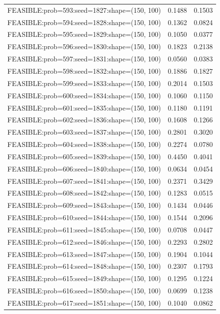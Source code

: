 \begin{longtable}{lcc}
FEASIBLE:prob=593:seed=1827:shape=(150, 100) &   0.1488 & 0.1503 \\
FEASIBLE:prob=594:seed=1828:shape=(150, 100) &   0.1362 & 0.0824 \\
FEASIBLE:prob=595:seed=1829:shape=(150, 100) &   0.1050 & 0.0377 \\
FEASIBLE:prob=596:seed=1830:shape=(150, 100) &   0.1823 & 0.2138 \\
FEASIBLE:prob=597:seed=1831:shape=(150, 100) &   0.0560 & 0.0383 \\
FEASIBLE:prob=598:seed=1832:shape=(150, 100) &   0.1886 & 0.1827 \\
FEASIBLE:prob=599:seed=1833:shape=(150, 100) &   0.2014 & 0.1503 \\
FEASIBLE:prob=600:seed=1834:shape=(150, 100) &   0.1060 & 0.1150 \\
FEASIBLE:prob=601:seed=1835:shape=(150, 100) &   0.1180 & 0.1191 \\
FEASIBLE:prob=602:seed=1836:shape=(150, 100) &   0.1608 & 0.1266 \\
FEASIBLE:prob=603:seed=1837:shape=(150, 100) &   0.2801 & 0.3020 \\
FEASIBLE:prob=604:seed=1838:shape=(150, 100) &   0.2274 & 0.0780 \\
FEASIBLE:prob=605:seed=1839:shape=(150, 100) &   0.4450 & 0.4041 \\
FEASIBLE:prob=606:seed=1840:shape=(150, 100) &   0.0634 & 0.0454 \\
FEASIBLE:prob=607:seed=1841:shape=(150, 100) &   0.2371 & 0.3429 \\
FEASIBLE:prob=608:seed=1842:shape=(150, 100) &   0.1283 & 0.0515 \\
FEASIBLE:prob=609:seed=1843:shape=(150, 100) &   0.1434 & 0.0446 \\
FEASIBLE:prob=610:seed=1844:shape=(150, 100) &   0.1544 & 0.2096 \\
FEASIBLE:prob=611:seed=1845:shape=(150, 100) &   0.0708 & 0.0447 \\
FEASIBLE:prob=612:seed=1846:shape=(150, 100) &   0.2293 & 0.2802 \\
FEASIBLE:prob=613:seed=1847:shape=(150, 100) &   0.1904 & 0.1044 \\
FEASIBLE:prob=614:seed=1848:shape=(150, 100) &   0.2307 & 0.1793 \\
FEASIBLE:prob=615:seed=1849:shape=(150, 100) &   0.1295 & 0.1224 \\
FEASIBLE:prob=616:seed=1850:shape=(150, 100) &   0.0699 & 0.1238 \\
FEASIBLE:prob=617:seed=1851:shape=(150, 100) &   0.1040 & 0.0862 \\

\end{longtable}
